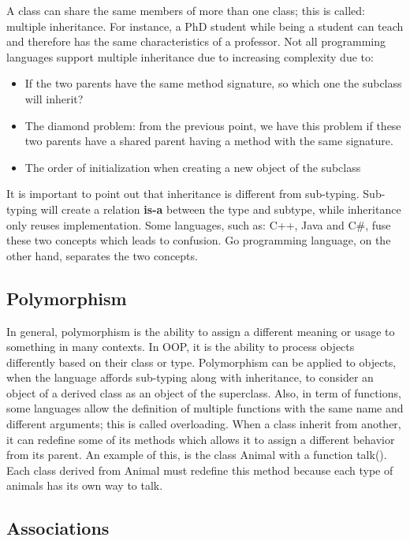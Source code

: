 \documentclass[12pt]{book}
\begin{document}
A class can share the same members of more than one class; this is called: multiple inheritance. 
For instance, a PhD student while being a student can teach and therefore has the same characteristics of a professor. 
Not all programming languages support multiple inheritance due to increasing complexity due to:
\begin{itemize}
	\item If the two parents have the same method signature, so which one the subclass will inherit?
	\item The diamond problem: from the previous point, we have this problem if these two parents have a shared parent having a method with the same signature.
	\item The order of initialization when creating a new object of the subclass 
\end{itemize}

It is important to point out that inheritance is different from sub-typing. 
Sub-typing will create a relation \textbf{is-a} between the type and subtype, while inheritance only reuses implementation.
Some languages, such as: C++, Java and C\#, fuse these two concepts which leads to confusion.
Go programming language, on the other hand, separates the two concepts.  

\subsection{Polymorphism}

In general, polymorphism is the ability to assign a different meaning or usage to something in many contexts. 
In OOP, it is the ability to process objects differently based on their class or type. 
Polymorphism can be applied to objects, when the language affords sub-typing along with inheritance, to consider an object of a derived class as an object of the superclass. 
Also, in term of functions, some languages allow the definition of multiple functions with the same name and different arguments; this is called overloading.
When a class inherit from another, it can redefine some of its methods which allows it to assign a different behavior from its parent.
An example of this, is the class Animal with a function talk(). 
Each class derived from Animal must redefine this method because each type of animals has its own way to talk.


\subsection{Associations}
\end{document}
